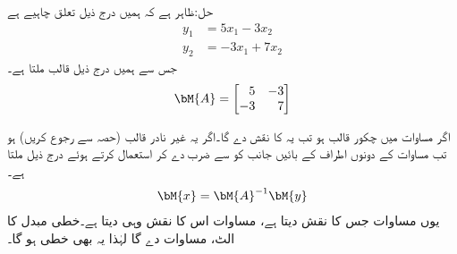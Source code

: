حل:ظاہر ہے کہ ہمیں درج ذیل تعلق چاہیے ہے 
\begin{align*}
y_1&=5x_1-3x_2\\
y_2&=-3x_1+7x_2
\end{align*} 
جس سے ہمیں درج ذیل قالب  ملتا ہے۔
\begin{align*}
\bM{A}=\begin{bmatrix*}[r] 5&-3\\-3&7 \end{bmatrix*}
\end{align*}

اگر مساوات  میں  چکور  قالب ہو تب یہ  کا نقش  دے گا۔اگر یہ  غیر نادر قالب (حصہ  سے رجوع کریں) ہو تب مساوات  کے دونوں اطراف کے بائیں جانب کو  سے ضرب دے کر   استعمال کرتے ہوئے درج ذیل  ملتا ہے۔
\begin{align}\label{مساوات_الجبرا_الٹ_تبادلہ_خطی_فضا_الف}
\bM{x}=\bM{A}^{-1}\bM{y}
\end{align}
یوں مساوات  جس  کا نقش  دیتا ہے، مساوات  اس  کا نقش وہی   دیتا ہے۔خطی مبدل کا الٹ، مساوات  دے گا لہٰذا یہ  بھی خطی ہو گا۔


